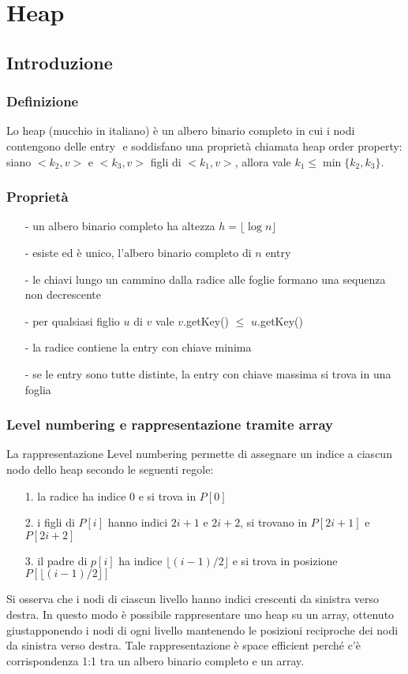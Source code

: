 \documentclass[a4paper]{article}
\begin{document}
\newpage

\section{Heap}
\subsection{Introduzione}
\subsubsection*{Definizione}
Lo heap (mucchio in italiano) è un albero binario completo in cui i nodi contengono delle entry \(<k,v>\) e soddisfano una proprietà
chiamata heap order property: siano \(<k_2,v>\) e \(<k_3,v>\) figli di \(<k_1,v>\), allora vale \(k_1 \leq \min \{k_2, k_3\}\).

\subsubsection*{Proprietà}
\begin{itemize}[topsep=3pt, itemsep=0pt]
	\item[-] un albero binario completo ha altezza \(h = \lfloor \log n \rfloor\)
	\item[-] esiste ed è unico, l'albero binario completo di \(n\) entry
	\item[-] le chiavi lungo un cammino dalla radice alle foglie formano una sequenza non decrescente
	\item[-] per qualsiasi figlio \(u\) di \(v\) vale \(v\).getKey() \(\leq\) \(u\).getKey()
	\item[-] la radice contiene la entry con chiave minima
	\item[-] se le entry sono tutte distinte, la entry con chiave massima si trova in una foglia
\end{itemize}

\subsubsection*{Level numbering e rappresentazione tramite array}
La rappresentazione Level numbering permette di assegnare un indice a ciascun nodo dello heap secondo le seguenti regole:
\begin{itemize}[topsep=3pt, itemsep=0pt]
	\item[1.] la radice ha indice 0 e si trova in \(P[0]\)
	\item[2.] i figli di \(P[i]\) hanno indici \(2i+1\) e \(2i+2\), si trovano in \(P[2i+1]\) e \(P[2i+2]\)
	\item[3.] il padre di \(p[i]\) ha indice \(\lfloor (i-1)/2 \rfloor\) e si trova in posizione \(P[\lfloor (i-1)/2 \rfloor]\)
\end{itemize}
Si osserva che i nodi di ciascun livello hanno indici crescenti da sinistra verso destra. In questo modo è possibile rappresentare
uno heap su un array, ottenuto giustapponendo i nodi di ogni livello mantenendo le posizioni reciproche dei nodi da sinistra verso
destra. Tale rappresentazione è space efficient perché c'è corrispondenza 1:1 tra un albero binario completo e un array.
\end{document}
